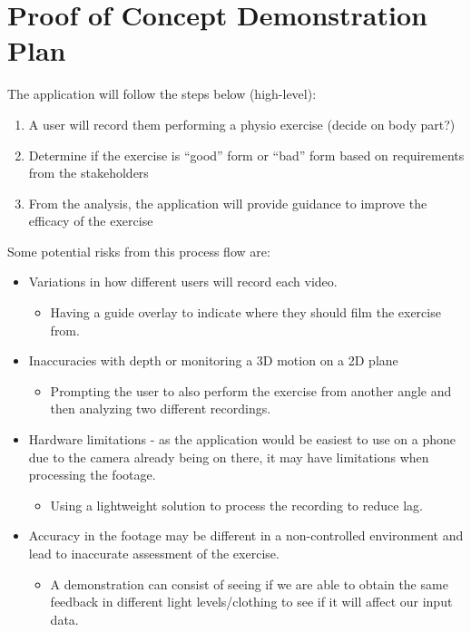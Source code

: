\documentclass{article}
\begin{document}
\section{Proof of Concept Demonstration Plan}

The application will follow the steps below (high-level):
\begin{enumerate}
  \item A user will record them performing a physio exercise (decide on body part?)
  \item Determine if the exercise is “good” form or “bad” form based on requirements from the stakeholders
  \item From the analysis, the application will provide guidance to improve the efficacy of the exercise
\end{enumerate}


Some potential risks from this process flow are:
\begin{itemize}
  \item Variations in how different users will record each video.
  \begin{itemize}
    \item Having a guide overlay to indicate where they should film the exercise from.
  \end{itemize}  
  \item Inaccuracies with depth or monitoring a 3D motion on a 2D plane
  \begin{itemize}
    \item Prompting the user to also perform the exercise from another angle and then analyzing two different recordings.
  \end{itemize}
  \item Hardware limitations - as the application would be easiest to use on a phone due to the camera already being on there, it may have limitations when processing the footage.
  \begin{itemize}
    \item Using a lightweight solution to process the recording to reduce lag.
  \end{itemize}
  \item Accuracy in the footage may be different in a non-controlled environment and lead to inaccurate assessment of the exercise. 
  \begin{itemize}
    \item A demonstration can consist of seeing if we are able to obtain the same feedback in different light levels/clothing to see if it will affect our input data.
  \end{itemize} 
\end{itemize}
\end{document}
